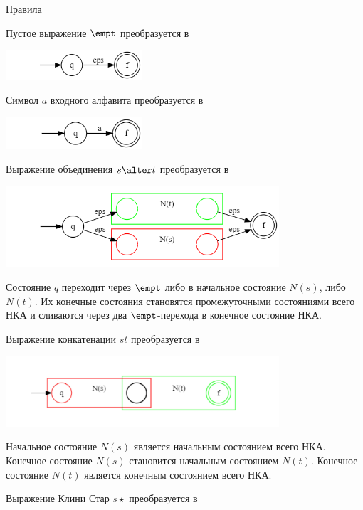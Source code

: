 \begin{frame}{Правила}  {\vspace{-5pt}}
    \vspace{-5pt}
     {
        Пустое выражение $\empt$ преобразуется в

        \includegraphics[width=2in, keepaspectratio]{tompson_rule1.png} %

        Символ $a$ входного алфавита преобразуется в

        \includegraphics[width=2in, keepaspectratio]{tompson_rule2.png} %
    }
     {
        Выражение объединения $s\alter t$ преобразуется в

        \includegraphics[width=4in, keepaspectratio]{tompson_rule3.png} %

        Состояние $q$ переходит через $\empt$ либо в начальное состояние $N(s)$, либо $N(t)$. Их конечные состояния становятся промежуточными состояниями всего НКА и сливаются через два $\empt$-перехода в конечное состояние НКА.
    }
     {
        Выражение конкатенации $st$ преобразуется в

        \includegraphics[width=4in, keepaspectratio]{tompson_rule4.png} %

        Начальное состояние $N(s)$ является начальным состоянием всего НКА. Конечное состояние $N(s)$ становится начальным состоянием $N(t)$. Конечное состояние $N(t)$ является конечным состоянием всего НКА.
    }
     {
        Выражение Клини Стар $s\star$ преобразуется в

}
\end{frame}
